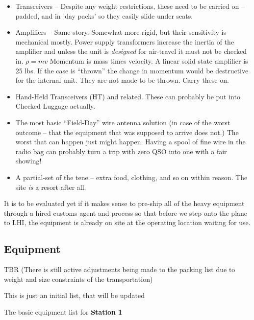 \documentclass[11pt]{article}
\begin{document}
\begin{itemize}
\item Transceivers -- Despite any weight restrictions, these need to
be carried on -- padded, and in 'day packs' so they easily slide under
seats.
\item Amplifiers -- Same story.  Somewhat more rigid, but their sensitivity
is mechanical mostly.  Power supply transformers increase the inertia of the
amplifier and unless the unit is {\textit{designed}} for air-travel
it must not be checked in. $\rho = mv$  Momentum is mass times
velocity. A linear solid state amplifier is 25 lbs.  If the case is ``thrown''
the change in momentum would be destructive for the internal unit.  They are
not made to be thrown.  Carry these on.
\item Hand-Held Transceivers (HT) and related.  These can probably be put into 
Checked
Luggage actually.
\item The most basic ``Field-Day'' wire antenna solution (in case of the
worst outcome -- that the equipment that was supposed to arrive does not.)
The worst that can happen just might happen. Having a spool of fine wire
in the radio bag can probably turn a trip with zero QSO into one with a fair
showing!
\item A partial-set of the {\gls{tene}} -- extra food, clothing,
and so on within reason.  The site {\textit{is}} a resort after all.
\end{itemize}

It is to be evaluated yet if it makes sense to pre-ship all of the
heavy equipment through a hired customs agent and process so that
before we step onto the plane to LHI, the equipment is already
on site at the operating location waiting for use.

\subsection{Equipment}

TBR (There is still active adjustments being made to the packing list
due to weight and size constraints of the transportation)
\par

This is just an initial list, that will be updated

The basic equipment list for {\textbf{Station 1}}
\end{document}
